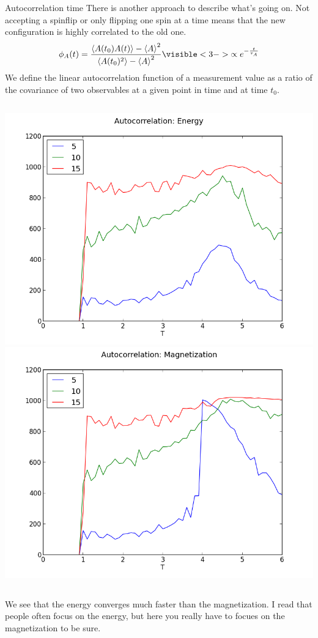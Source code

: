 \documentclass[]{beamer}
\begin{document}
\begin{frame}{Autocorrelation time}
 {There is another approach to describe what's going on. Not accepting a spinflip or only flipping one spin at a time means that the new configuration is highly correlated to the old one.}
\pause
\[ \phi_{A}(t) = \frac{\left< A(t_0)A(t) \right> - \left< A \right>^2}{\left< A(t_0)^2 \right> - \left< A \right>^2} \visible<3->{\propto e^{-\frac{t}{\tau_A}}} \]
 {We define the linear autocorrelation function of a measurement value as a ratio of the covariance of two observables at a given point in time and at time \(t_0\).}
\begin{columns}[c]
	\pause[4]
	\includegraphics[width=\textwidth]{../results/measurements/autocorr_energy_single.png}
	\pause[5]
	\includegraphics[width=\textwidth]{../results/measurements/autocorr_magnetization_single.png}
\end{columns}
 {We see that the energy converges much faster than the magnetization. I read that people often focus on the energy, but here you really have to focues on the magnetization to be sure.}
\end{frame}
\end{document}
